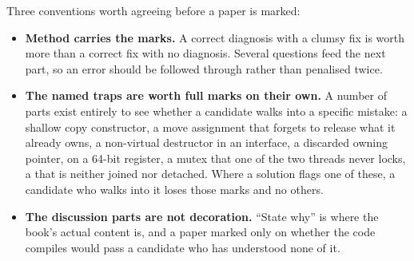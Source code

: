 Three conventions worth agreeing before a paper is marked:
\begin{itemize}
  \item \textbf{Method carries the marks.} A correct diagnosis with a clumsy fix is worth more than a
    correct fix with no diagnosis. Several questions feed the next part, so an error should be
    followed through rather than penalised twice.
  \item \textbf{The named traps are worth full marks on their own.} A number of parts exist entirely
    to see whether a candidate walks into a specific mistake: a shallow copy constructor, a move
    assignment that forgets to release what it already owns, a non-virtual destructor in an
    interface, a discarded owning pointer,  on a 64-bit register, a mutex that one
    of the two threads never locks, a  that is neither joined nor detached. Where
    a solution flags one of these, a candidate who walks into it loses those marks and no others.
  \item \textbf{The discussion parts are not decoration.} ``State why'' is where the book's actual
    content is, and a paper marked only on whether the code compiles would pass a candidate who has
    understood none of it.
\end{itemize}
